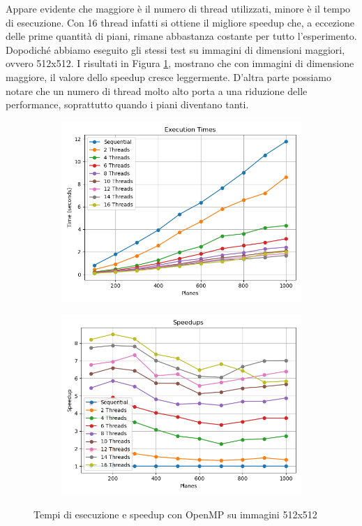 Appare evidente che maggiore è il numero di thread utilizzati, minore è il tempo di esecuzione.
Con 16 thread infatti si ottiene il migliore speedup che, a eccezione delle prime quantità di piani, rimane abbastanza costante per tutto l'esperimento.\\

Dopodiché abbiamo eseguito gli stessi test su immagini di dimensioni maggiori, ovvero 512x512.
I risultati in Figura \ref{fig:omp_512}, mostrano che con immagini di dimensione maggiore, il valore dello speedup cresce leggermente.
D'altra parte possiamo notare che un numero di thread molto alto porta a una riduzione delle performance, soprattutto quando i piani diventano tanti.
\begin{figure}[H]
    \centering
    \begin{subfigure}{0.49\textwidth}
        \centering
        \includegraphics[width=\textwidth]{../result_16/plots/512/results_times}
    \end{subfigure}
    \begin{subfigure}{0.49\textwidth}
        \centering
        \includegraphics[width=\textwidth]{../result_16/plots/512/results_speedup}
    \end{subfigure}
    \caption{Tempi di esecuzione e speedup con OpenMP su immagini 512x512}
    \label{fig:omp_512}
\end{figure}

